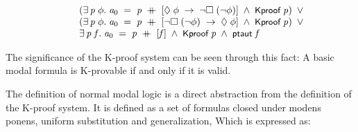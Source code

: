 \documentclass{report}
\renewcommand{\HOLConst}[1]{{\textsf{\upshape\small #1}}}
\newenvironment{holmath}{\begin{displaymath}\begin{array}{l}}{\end{array}\end{displaymath}\ignorespacesafterend}
\begin{document}
\begin{holmath}
\;\;\;\;\;\;\;\;\;(\HOLSymConst{\HOLTokenExists{}}\HOLBoundVar{p}\;\HOLBoundVar{\ensuremath{\phi}}.\;\HOLFreeVar{a\sb{\mathrm{0}}}\;\HOLSymConst{=}\;\HOLBoundVar{p}\;\HOLSymConst{\HOLTokenDoublePlus}\;[\HOLSymConst{\ensuremath{\Diamond}}\;\HOLBoundVar{\ensuremath{\phi}}\;\HOLSymConst{\ensuremath{\rightarrow}}\;\HOLSymConst{\HOLTokenNeg{}}\HOLSymConst{\ensuremath{\Box}}\;(\HOLSymConst{\HOLTokenNeg{}}\HOLBoundVar{\ensuremath{\phi}})]\;\HOLSymConst{\HOLTokenConj{}}\;\HOLConst{Kproof}\;\HOLBoundVar{p})\;\HOLSymConst{\HOLTokenDisj{}}\\
\;\;\;\;\;\;\;\;\;(\HOLSymConst{\HOLTokenExists{}}\HOLBoundVar{p}\;\HOLBoundVar{\ensuremath{\phi}}.\;\HOLFreeVar{a\sb{\mathrm{0}}}\;\HOLSymConst{=}\;\HOLBoundVar{p}\;\HOLSymConst{\HOLTokenDoublePlus}\;[\HOLSymConst{\HOLTokenNeg{}}\HOLSymConst{\ensuremath{\Box}}\;(\HOLSymConst{\HOLTokenNeg{}}\HOLBoundVar{\ensuremath{\phi}})\;\HOLSymConst{\ensuremath{\rightarrow}}\;\HOLSymConst{\ensuremath{\Diamond}}\;\HOLBoundVar{\ensuremath{\phi}}]\;\HOLSymConst{\HOLTokenConj{}}\;\HOLConst{Kproof}\;\HOLBoundVar{p})\;\HOLSymConst{\HOLTokenDisj{}}\\
\;\;\;\;\;\;\;\;\;\HOLSymConst{\HOLTokenExists{}}\HOLBoundVar{p}\;\HOLBoundVar{f}.\;\HOLFreeVar{a\sb{\mathrm{0}}}\;\HOLSymConst{=}\;\HOLBoundVar{p}\;\HOLSymConst{\HOLTokenDoublePlus}\;[\HOLBoundVar{f}]\;\HOLSymConst{\HOLTokenConj{}}\;\HOLConst{Kproof}\;\HOLBoundVar{p}\;\HOLSymConst{\HOLTokenConj{}}\;\HOLConst{ptaut}\;\HOLBoundVar{f}
\end{holmath}

The significance of the K-proof system can be seen through this fact: A basic modal formula is K-provable if and only if it is valid.

The definition of normal modal logic is a direct abstraction from the definition of the K-proof system. It is defined as a set of formulas closed under modens ponens, uniform substitution and generalization, Which is expressed as:
\end{document}
